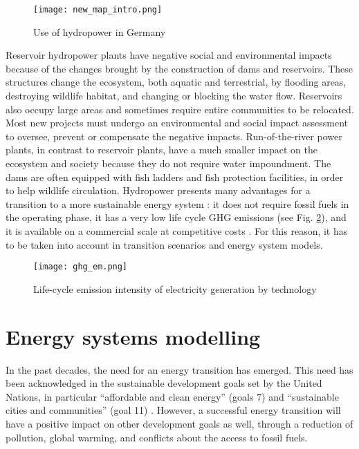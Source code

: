 \begin{figure}[H]
\centering
\texttt{[image: new\_map\_intro.png]}
\caption[Use of hydropower in Germany]{Use of hydropower in Germany}
\label{hp_de}
\end{figure}

Reservoir hydropower plants have negative social and environmental impacts because of the changes brought by the construction of dams and reservoirs. These structures change the ecosystem, both aquatic and terrestrial, by flooding areas, destroying wildlife habitat, and changing or blocking the water flow. Reservoirs also occupy large areas and sometimes require entire communities to be relocated. Most new projects must undergo an environmental and social impact assessment to oversee, prevent or compensate the negative impacts. Run-of-the-river power plants, in contrast to reservoir plants, have a much smaller impact on the ecosystem and society because they do not require water impoundment. The dams are often equipped with fish ladders and fish protection facilities, in order to help wildlife circulation. \newline 
Hydropower presents many advantages for a transition to a more sustainable energy system : it does not require fossil fuels in the operating phase, it has a very low life cycle GHG emissions (see Fig. \ref{ghg_em}), and it is available on a commercial scale at competitive costs \cite{hp_europe}. For this reason, it has to be taken into account in transition scenarios and energy system models. 

\begin{figure}[H]
\centering
\texttt{[image: ghg\_em.png]}
\caption[Life-cycle emission intensity of electricity generation by technology]{Life-cycle emission intensity of electricity generation by technology \cite{hp_europe}}
\label{ghg_em}
\end{figure}


\section{Energy systems modelling}

In the past decades, the need for an energy transition has emerged. This need has been acknowledged in the sustainable development goals \cite{un_sdgs} set by the United Nations, in particular ``affordable and clean energy'' (goals 7) \cite{un_sdg7} and ``sustainable cities and communities'' (goal 11) \cite{un_sdg11}. However, a successful energy transition will have a positive impact on other development goals as well, through a reduction of pollution, global warming, and conflicts about the access to fossil fuels. \newline

